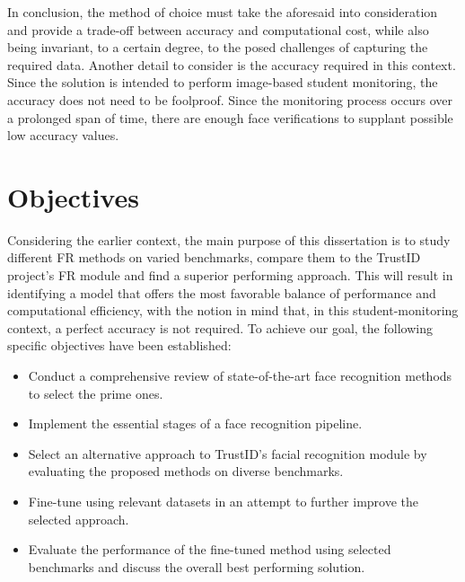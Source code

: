 \documentclass[class=report, crop=false, a4paper, 12pt]{standalone}
\begin{document}
\par In conclusion, the method of choice must take the aforesaid into consideration and provide a trade-off between accuracy and computational cost, while also being invariant, to a certain degree, to the posed challenges of capturing the required data. Another detail to consider is the accuracy required in this context. Since the solution is intended to perform image-based student monitoring, the accuracy does not need to be foolproof. Since the monitoring process occurs over a prolonged span of time, there are enough face verifications to supplant possible low accuracy values.

\section{Objectives}
Considering the earlier context, the main purpose of this dissertation is to study different \gls{FR} methods on varied benchmarks, compare them to the TrustID project's FR module and find a superior performing approach. This will result in identifying a model that offers the most favorable balance of performance and computational efficiency, with the notion in mind that, in this student-monitoring context, a perfect accuracy is not required. To achieve our goal, the following specific objectives have been established:
\begin{itemize}
    \item Conduct a comprehensive review of state-of-the-art face recognition methods to select the prime ones.
    \item Implement the essential stages of a face recognition pipeline.
    \item Select an alternative approach to TrustID's facial recognition module by evaluating the proposed methods on diverse benchmarks.
    \item Fine-tune using relevant datasets in an attempt to further improve the selected approach.
    \item Evaluate the performance of the fine-tuned method using selected benchmarks and discuss the overall best performing solution.
\end{itemize}
\end{document}
